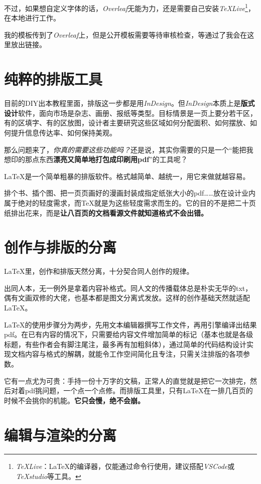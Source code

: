 \documentclass[10pt,openany]{book}
\begin{document}
\begin{sloppypar}
不过，如果想自定义字体的话，\textit{Overleaf}无能为力，还是需要自己安装\textit{TeXLive}\footnote{\textit{TeXLive}：{\LaTeX}的编译器，仅能通过命令行使用，建议搭配\textit{VSCode}或\textit{TeXstudio}等工具。}，在本地进行工作。

我的模板传到了\textit{Overleaf}上，但是公开模板需要等待审核检查，等通过了我会在这里放出链接。

\section{纯粹的排版工具}

目前的DIY出本教程里面，排版这一步都是用\textit{InDesign}。但\textit{InDesign}本质上是\textbf{版式设计}软件，面向市场是杂志、画册、报纸等类型。目标情景是一页上要分若干区，有的区填字、有的区放图，设计者主要研究这些区域如何分配面积、如何摆放、如何提升信息传达率、如何保持美观。

那么问题来了，\emph{你真的需要这些功能吗？}还是说，其实你需要的只是一个“能把我想印的那点东西\textbf{漂亮又简单地打包成印刷用pdf}”的工具呢？

{\LaTeX}是一个简单粗暴的排版软件。格式越简单、越统一，用它来做就越容易。

排个书、插个图、把一页页画好的漫画封装成指定纸张大小的pdf……放在设计业内属于绝对的轻度需求，而{\TeX}就是为这些轻度需求而生的。它的目的不是把二十页纸排出花来，而是\textbf{让八百页的文档看源文件就知道格式不会出错。}

\section{创作与排版的分离}

 {\LaTeX}里，创作和排版天然分离，十分契合同人创作的规律。

出同人本，无一例外是拿着内容补格式。同人文的传播载体总是朴实无华的txt，偶有文画双修的大佬，也基本都是图文分离式发放。这样的创作基础天然就适配{\LaTeX}。

{\LaTeX}的使用步骤分为两步，先用文本编辑器撰写工作文件，再用引擎编译出结果pdf。在已有内容的情况下，只需要给内容文件增加简单的标记（基本也就是各级标题，有些作者会有脚注尾注，最多再有加粗斜体），通过简单的代码结构设计实现文档内容与格式的解耦，就能令工作空间简化且专注，只需关注排版的各项参数。

它有一点尤为可贵：手持一份十万字的文稿，正常人的直觉就是把它一次排完，然后对着pdf挑问题，一个点一个点修。而排版工具里，只有{\LaTeX}在一排几百页的时候不会挑你的机能。\textbf{它只会慢，绝不会崩。}

\section{编辑与渲染的分离}


\end{sloppypar}
\end{document}
